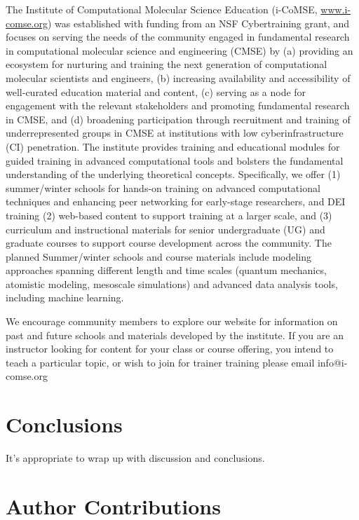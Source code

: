 \documentclass[9pt,review]{livecoms}
\begin{document}
The Institute of Computational Molecular Science Education (i-CoMSE, \href{www.i-comse.org}{www.i-comse.org}) was established with funding from an NSF Cybertraining grant, and focuses on serving the needs of the community engaged in fundamental research in computational molecular science and engineering (CMSE) by (a) providing an ecosystem for nurturing and training the next generation of computational molecular scientists and engineers, (b) increasing availability and accessibility of well-curated education material and content, (c) serving as a node for engagement with the relevant stakeholders and promoting fundamental research in CMSE, and (d) broadening participation through recruitment and training of underrepresented groups in CMSE at institutions with low cyberinfrastructure (CI) penetration. 
The institute provides training and educational modules for guided training in advanced computational tools and bolsters the fundamental understanding of the underlying theoretical concepts. Specifically, we offer (1) summer/winter schools for hands-on training on advanced computational techniques and enhancing peer networking for early-stage researchers, and DEI training (2) web-based content to support training at a larger scale, and (3) curriculum and instructional materials for senior undergraduate (UG) and graduate courses to support course development across the community. The planned Summer/winter schools and course materials include modeling approaches spanning different length and time scales (quantum mechanics, atomistic modeling, mesoscale simulations) and advanced data analysis tools, including machine learning. 

 We encourage community members to explore our website for information on past and future schools and materials developed by the institute. If you are an instructor looking for content for your class or course offering, you intend to teach a particular topic, or wish to join for trainer training please email info@i-comse.org


\section{Conclusions}

It's appropriate to wrap up with discussion and conclusions.







\section*{Author Contributions}
%
\end{document}
